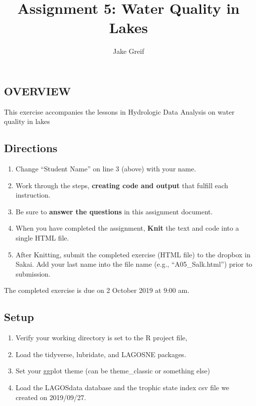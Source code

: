 \documentclass[]{article}
\title{Assignment 5: Water Quality in Lakes}
\author{Jake Greif}
\date{}
\providecommand{\tightlist}{%
  \setlength{\itemsep}{0pt}\setlength{\parskip}{0pt}}
\begin{document}
\maketitle

\hypertarget{overview}{%
\subsection{OVERVIEW}\label{overview}}

This exercise accompanies the lessons in Hydrologic Data Analysis on
water quality in lakes

\hypertarget{directions}{%
\subsection{Directions}\label{directions}}

\begin{enumerate}
\def\labelenumi{\arabic{enumi}.}
\tightlist
\item
  Change ``Student Name'' on line 3 (above) with your name.
\item
  Work through the steps, \textbf{creating code and output} that fulfill
  each instruction.
\item
  Be sure to \textbf{answer the questions} in this assignment document.
\item
  When you have completed the assignment, \textbf{Knit} the text and
  code into a single HTML file.
\item
  After Knitting, submit the completed exercise (HTML file) to the
  dropbox in Sakai. Add your last name into the file name (e.g.,
  ``A05\_Salk.html'') prior to submission.
\end{enumerate}

The completed exercise is due on 2 October 2019 at 9:00 am.

\hypertarget{setup}{%
\subsection{Setup}\label{setup}}

\begin{enumerate}
\def\labelenumi{\arabic{enumi}.}
\tightlist
\item
  Verify your working directory is set to the R project file,
\item
  Load the tidyverse, lubridate, and LAGOSNE packages.
\item
  Set your ggplot theme (can be theme\_classic or something else)
\item
  Load the LAGOSdata database and the trophic state index csv file we
  created on 2019/09/27.
\end{enumerate}
\end{document}
